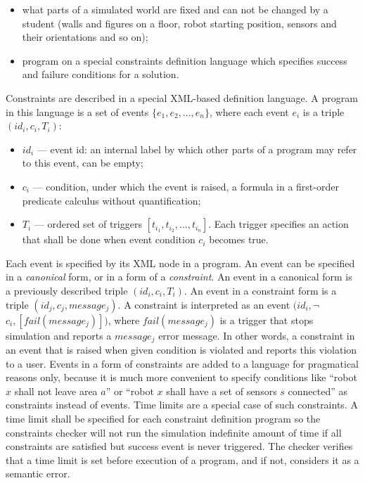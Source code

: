 \documentclass[conference]{IEEEtran}
\begin{document}
\begin{itemize}
    \item what parts of a simulated world are fixed and can not be changed by a student (walls and figures on a floor, robot starting position, sensors and their orientations and so on);
    \item program on a special constraints definition language which specifies success and failure conditions for a solution.
\end{itemize}

Constraints are described in a special XML-based definition language. A program in this language is a set of events $\{ e_1, e_2, ..., e_n \}$, where each event $e_i$ is a triple $(id_i, c_i, T_i)$:

\begin{itemize}
    \item $id_i$ --- event id: an internal label by which other parts of a program may refer to this event, can be empty;
    \item $c_i$ --- condition, under which the event is raised, a formula in a first-order predicate calculus without quantification;
    \item $T_i$ --- ordered set of triggers $[ t_{i_1}, t_{i_2}, ..., t_{i_n} ]$. Each trigger specifies an action that shall be done when event condition $c_i$ becomes true.
\end{itemize}

Each event is specified by its XML node in a program. An event can be specified in a \textit{canonical} form, or in a form of a \textit{constraint}. An event in a canonical form is a previously described triple $(id_i, c_i, T_i)$. An event in a constraint form is a triple $(id_j, c_j, message_j)$. A constraint is interpreted as an event $(id_i, $$\neg$$c_i, [ fail(message_j) ])$, where $fail(message_j)$ is a trigger that stops simulation and reports a $message_j$ error message. In other words, a constraint in an event that is raised when given condition is violated and reports this violation to a user. Events in a form of constraints are added to a language for pragmatical reasons only, because it is much more convenient to specify conditions like ``robot $x$ shall not leave area $a$'' or ``robot $x$ shall have a set of sensors $s$ connected'' as constraints instead of events. Time limits are a special case of such constraints. A time limit shall be specified for each constraint definition program so the constraints checker will not run the simulation indefinite amount of time if all constraints are satisfied but success event is never triggered. The checker verifies that a time limit is set before execution of a program, and if not, considers it as a semantic error.
\end{document}
